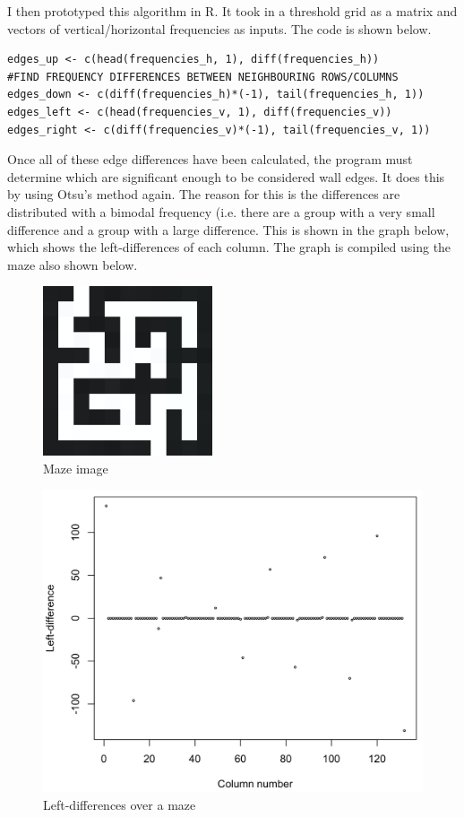 \documentclass[titlepage]{article}
\begin{document}
I then prototyped this algorithm in R. It took in a threshold grid as a matrix and vectors of vertical/horizontal frequencies as inputs. The code is shown below.

\begin{changemargin}{-1in}{-1in} 
\begin{verbatim}
edges_up <- c(head(frequencies_h, 1), diff(frequencies_h))                      #FIND FREQUENCY DIFFERENCES BETWEEN NEIGHBOURING ROWS/COLUMNS
edges_down <- c(diff(frequencies_h)*(-1), tail(frequencies_h, 1))
edges_left <- c(head(frequencies_v, 1), diff(frequencies_v))
edges_right <- c(diff(frequencies_v)*(-1), tail(frequencies_v, 1))
\end{verbatim}
\end{changemargin} 

Once all of these edge differences have been calculated, the program must determine which are significant enough to be considered wall edges. It does this by using Otsu's method again. The reason for this is the differences are distributed with a bimodal frequency (i.e. there are a group with a very small difference and a group with a large difference. This is shown in the graph below, which shows the left-differences of each column. The graph is compiled using the maze also shown below.

\begin{figure}[H]
  \centering
  \includegraphics[width=5cm]{Demo.png}
  \caption{Maze image}
  \label{fig:dijk}
\end{figure}

\begin{figure}[H]
  \centering
  \includegraphics[width=12cm]{Edges.png}
  \caption{Left-differences over a maze}
  \label{fig:dijk}
\end{figure}
\end{document}
